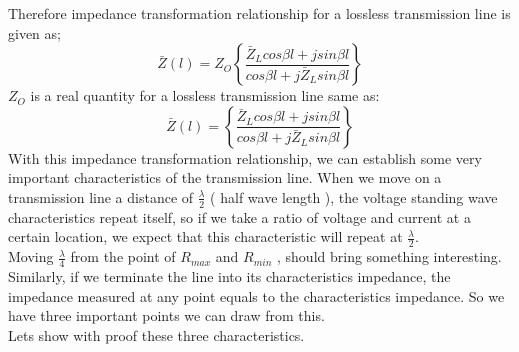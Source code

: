 Therefore impedance transformation relationship for a lossless transmission line is given as;
\begin{equation}
\bar{Z}(l) = Z_{O}\left\lbrace \frac{\bar{Z}_Lcos\beta l + jsin\beta l}{cos\beta l + j\bar{Z}_Lsin\beta l}\right\rbrace 
\end{equation}
$Z_O$ is a real quantity for a lossless transmission line same as:
\begin{equation}
\bar{Z}(l) = \left\lbrace \frac{\bar{Z}_Lcos\beta l + jsin\beta l}{cos\beta l + j\bar{Z}_Lsin\beta l}\right\rbrace 
\end{equation}
With this impedance transformation relationship, we can establish some very important characteristics of the transmission line. When we move on a transmission line a distance of $\frac{\lambda}{2}$ ( half wave length ), the voltage standing wave characteristics repeat itself, so if we take a ratio of voltage and current at a certain location, we expect that this characteristic will repeat at $\frac{\lambda}{2}$.\\
Moving $\frac{\lambda}{4}$ from the point of $R_{max}$ and $R_{min}$ , should bring something interesting. Similarly, if we terminate the line into its characteristics impedance, the impedance measured at any point equals to the characteristics impedance. So we have three important points we can draw from this.\\
Lets show with proof these three characteristics.
